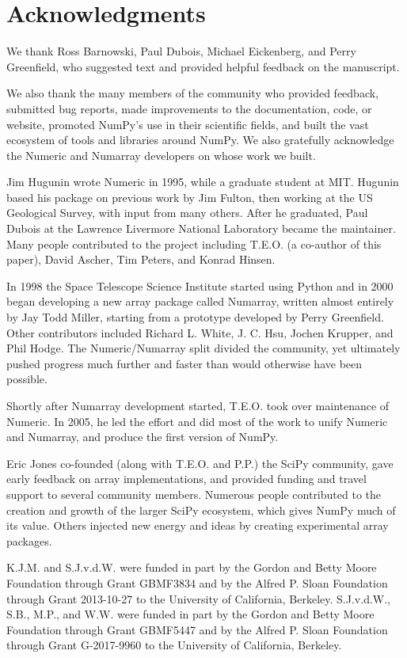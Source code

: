 \documentclass[twocolumn]{article}
\begin{document}
\section*{Acknowledgments}

We thank Ross Barnowski, Paul Dubois, Michael Eickenberg, and Perry Greenfield, who
suggested text and provided helpful feedback on the manuscript.

We also thank the many members of the community who provided
feedback, submitted bug reports, made improvements to the documentation,
code, or website, promoted NumPy's use in their scientific fields, and built
the vast ecosystem of tools and libraries around NumPy.
We also gratefully acknowledge the Numeric and Numarray developers
on whose work we built.  

Jim Hugunin wrote Numeric in 1995, while a graduate student at MIT.
Hugunin based his package on previous work by Jim Fulton, then working at the
US Geological Survey, with input from many others.
After he graduated, Paul Dubois at the Lawrence Livermore National Laboratory
became the maintainer.
Many people contributed to the project including T.E.O. (a co-author
of this paper), David Ascher, Tim Peters, and Konrad Hinsen.

In 1998 the Space Telescope Science Institute started using Python
and in 2000 began developing a new array package called Numarray, written
almost entirely by Jay Todd Miller, starting from a prototype developed by
Perry Greenfield.  Other contributors included Richard L. White, J. C. Hsu,
Jochen Krupper, and Phil Hodge.
The Numeric/Numarray split divided the community, yet ultimately pushed
progress much further and faster than would otherwise have been possible. 

Shortly after Numarray development started, T.E.O. took over maintenance of
Numeric. In 2005, he led the effort and did most of the work to unify Numeric
and Numarray, and produce the first version of NumPy.

Eric Jones co-founded (along with T.E.O. and P.P.) the SciPy community, gave early feedback on array
implementations, and provided funding and travel support to several
community members.
Numerous people contributed to the creation and
growth of the larger SciPy ecosystem, which gives NumPy much of its
value. Others injected new energy and ideas by creating experimental
array packages.

K.J.M. and S.J.v.d.W. were funded in part by the Gordon and Betty Moore
Foundation through Grant GBMF3834 and by the Alfred P. Sloan Foundation through
Grant 2013-10-27 to the University of California, Berkeley.
S.J.v.d.W., S.B., M.P., and W.W. were funded in part by the Gordon
and Betty Moore Foundation through Grant GBMF5447 and by the Alfred
P. Sloan Foundation through Grant G-2017-9960 to the University of
California, Berkeley.
\end{document}
